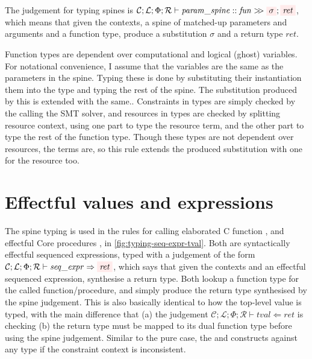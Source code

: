 The judgement for typing spines is $\mathcal{C}; \mathcal{L}; \Phi ;
\mathcal{R} \vdash \mathit{param\_spine} \mathrel{{:}{:}} \mathit{fun} >\!\!>
\outpol{\sigma}; \outpol{ret}$, which means that given the contexts, a spine of
matched-up parameters and arguments and a function type, produce a substitution
$\sigma$ and a return type $\mathit{ret}$.

Function types are dependent over computational and logical (ghost) variables.
For notational convenience, I assume that the variables are the same as the
parameters in the spine. Typing these is done by substituting their
instantiation them into the type and typing
the rest of the spine. The substitution produced by this is extended with the
same.\label{sn:tail-rec-sub}. Constraints in types are
simply checked by the calling the SMT solver, and resources in types are
checked by splitting resource context, using one part to type the resource
term, and the other part to type the rest of the function type. Though these
types are not dependent over resources, the terms are, so this rule extends the
produced substitution with one for the resource too.

\section{Effectful values and expressions}

The spine typing is used in the rules for calling elaborated C function
, and effectful Core procedures %
, in \cref{fig:typing-seq-expr-tval}. Both are %
syntactically effectful sequenced expressions, typed with a judgement of the
form $\mathcal{C}; \mathcal{L}; \Phi; \mathcal{R} \vdash \mathit{seq\_expr}
\Rightarrow \outpol{ret}$, which says that given the contexts and an effectful
sequenced expression, synthesise a return type. Both lookup a function type for
the called function/procedure, and simply produce the return type synthesised by the spine
judgement. This is also basically identical to how the top-level value
 is typed, with the main difference that (a) the judgement
$\mathcal{C}; \mathcal{L}; \Phi; \mathcal{R} \vdash \mathit{tval} \Leftarrow
\mathit{ret}$ is checking (b) the return type must be mapped to its dual
function type before using the spine judgement. Similar to the pure case, the
 and  constructs %
against any type if the constraint context is inconsistent.


